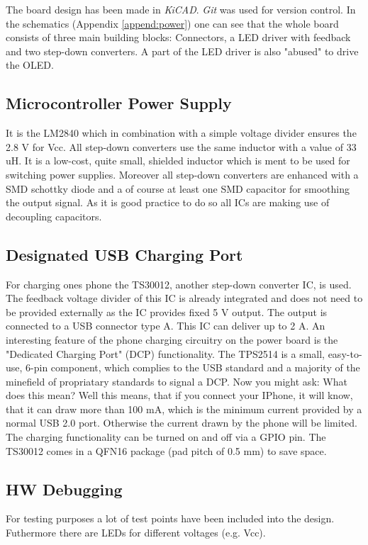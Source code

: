 The board design has been made in \textit{KiCAD}. \textit{Git} was used for version control. In the schematics (Appendix \ref{append:power}) one can see that the whole board consists of three main building blocks: Connectors, a LED driver with feedback and two step-down converters. A part of the LED driver is also "abused" to drive the OLED. 
\subsection{Microcontroller Power Supply}
It is the LM2840 which in combination with a simple voltage divider ensures the 2.8 V for Vcc. All step-down converters use the same inductor with a value of 33 uH. It is a low-cost, quite small, shielded inductor which is ment to be used for switching power supplies. Moreover all step-down converters are enhanced with a SMD schottky diode and a of course at least one SMD capacitor for smoothing the output signal. As it is good practice to do so all ICs are making use of decoupling capacitors. 
\subsection{Designated USB Charging Port}
For charging ones phone the TS30012, another step-down converter IC, is used. The feedback voltage divider of this IC is already integrated and does not need to be provided externally as the IC provides fixed 5 V output. The output is connected to a USB connector type A. This IC can deliver up to 2 A. An interesting feature of the phone charging circuitry on the power board is the "Dedicated Charging Port" (DCP) functionality. The TPS2514 is a small, easy-to-use, 6-pin component, which complies to the USB standard and a majority of the minefield of propriatary standards to signal a DCP. Now you might ask: What does this mean? Well this means, that if you connect your IPhone, it will know, that it can draw more than 100 mA, which is the minimum current provided by a normal USB 2.0 port. Otherwise the current drawn by the phone will be limited. The charging functionality can be turned on and off via a GPIO pin. The TS30012 comes in a QFN16 package (pad pitch of 0.5 mm) to save space.   
\subsection{HW Debugging}
For testing purposes a lot of test points have been included into the design. Futhermore there are LEDs for different voltages (e.g. Vcc).
